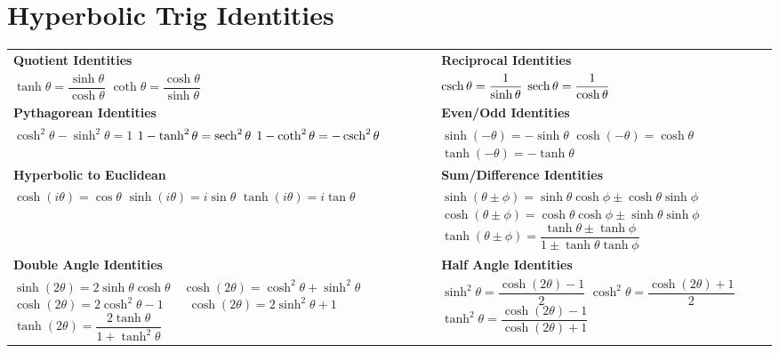 \documentclass[oneside]{book}
\numberwithin{figure}{section}
\numberwithin{equation}{section}
\theoremstyle{definition}
\begin{document}
	\section{Hyperbolic Trig Identities}
	\bgroup
	\renewcommand\cellgape{\Gape[5pt]}
	\setlength\extrarowheight{5pt}
	\renewcommand\cellset{\renewcommand\arraystretch{2}%
		\setlength\extrarowheight{0pt}}
	\begin{tabularx}{\columnwidth}{Y Y}
		\textbf{Quotient Identities} & \textbf{Reciprocal Identities}\\
		\makecell[c]{$ \tanh\theta = \dfrac{\sinh\theta}{\cosh\theta} $\\
			$ \coth\theta = \dfrac{\cosh\theta}{\sinh\theta} $} & \\
		\textbf{Pythagorean Identities} & \textbf{Even/Odd Identities}\\
		 & \makecell[c]{$ \sinh(-\theta) = -\sinh\theta $\\
			$ \cosh(-\theta) = \cosh\theta $\\
			$ \tanh(-\theta) = -\tanh\theta $}\\
		\textbf{Hyperbolic to Euclidean} & \textbf{Sum/Difference Identities}\\
		 & \makecell[c]{$ \sinh(\theta \pm \phi) = \sinh\theta\cosh\phi \pm \cosh\theta\sinh\phi $\\
			$ \cosh(\theta \pm \phi) = \cosh\theta\cosh\phi \pm \sinh\theta\sinh\phi $\\
			$ \tanh(\theta \pm \phi) = \dfrac{\tanh\theta \pm \tanh\phi}{1 \pm \tanh\theta\tanh\phi} $}\\
		\textbf{Double Angle Identities} & \textbf{Half Angle Identities}\\
		 & 
	\end{tabularx}
	\egroup
	
\end{document}
